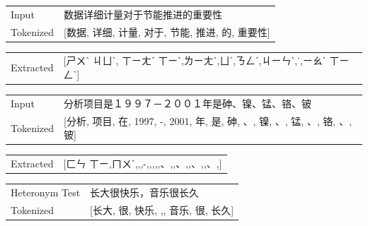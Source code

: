     \begin{table}[h]
        \centering

        \begin{CJK*}{UTF8}{gbsn}
            \begin{tabular}{p{2.3cm}p{12cm}}\toprule
                Input & 数据详细计量对于节能推进的重要性 \\
                Tokenized & [数据, 详细, 计量, 对于, 节能, 推进, 的, 重要性] \\
            \end{tabular}
        \end{CJK*}
        
        \begin{CJK}{UTF8}{bsmi}
        \begin{tabular}{p{2.3cm}p{12cm}}
            Extracted & [ㄕㄨˋ ㄐㄩˋ,\enspace
            ㄒㄧㄤˊ ㄒㄧˋ, ㄌㄧㄤˋ, ㄩˊ, ㄋㄥˊ, ㄐㄧㄣˋ,˙, ㄧㄠˋ ㄒㄧㄥˋ]
        \end{tabular}
        \end{CJK}

        \begin{CJK*}{UTF8}{gbsn}
            \begin{tabular}{p{2.3cm}p{12cm}}\toprule
                Input & 分析项目是１９９７－２００１年是砷、镍、锰、铬、铍 \\
                Tokenized & [分析, 项目, 在, 1997, -, 2001, 年, 是, 砷, 、, 镍, 、, 锰, 、, 铬, 、, 铍] \\
            \end{tabular}
        \end{CJK*}
        
        \begin{CJK}{UTF8}{bsmi}
        \begin{tabular}{p{2.3cm}p{12cm}}
            Extracted & [ㄈㄣ ㄒㄧ, ㄇㄨˋ,,\enspace1997,\enspace-,\enspace2001,,,,\enspace、,,\enspace、,,\enspace、,,\enspace、,]
        \end{tabular}
        \end{CJK}

        \begin{CJK*}{UTF8}{gbsn}
            \begin{tabular}{p{2.3cm}p{12cm}}\toprule
                Heteronym Test & 长大很快乐，音乐很长久 \\
                Tokenized & [长大, 很, 快乐, ,, 音乐, 很, 长久] \\
            \end{tabular}
        \end{CJK*}
        

\end{table}
